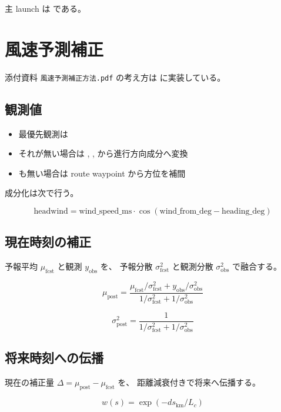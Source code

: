 \documentclass[a4paper,11pt]{article}
\begin{document}
主 launch は  である。

\section{風速予測補正}

添付資料 \texttt{風速予測補正方法.pdf} の考え方は
 に実装している。

\subsection{観測値}

\begin{itemize}
  \item 最優先観測は 
  \item それが無い場合は , ,  から進行方向成分へ変換
  \item {} も無い場合は route waypoint から方位を補間
\end{itemize}

成分化は次で行う。

\[
\mathrm{headwind} = \mathrm{wind\_speed\_ms} \cdot \cos(\mathrm{wind\_from\_deg} - \mathrm{heading\_deg})
\]

\subsection{現在時刻の補正}

予報平均 $\mu_{\mathrm{fcst}}$ と観測 $y_{\mathrm{obs}}$ を、
予報分散 $\sigma_{\mathrm{fcst}}^2$ と観測分散 $\sigma_{\mathrm{obs}}^2$ で融合する。

\[
\mu_{\mathrm{post}} =
\frac{\mu_{\mathrm{fcst}} / \sigma_{\mathrm{fcst}}^2 + y_{\mathrm{obs}} / \sigma_{\mathrm{obs}}^2}
{1 / \sigma_{\mathrm{fcst}}^2 + 1 / \sigma_{\mathrm{obs}}^2}
\]

\[
\sigma_{\mathrm{post}}^2 =
\frac{1}{1 / \sigma_{\mathrm{fcst}}^2 + 1 / \sigma_{\mathrm{obs}}^2}
\]

\subsection{将来時刻への伝播}

現在の補正量 $\Delta = \mu_{\mathrm{post}} - \mu_{\mathrm{fcst}}$ を、
距離減衰付きで将来へ伝播する。

\[
w(s) = \exp(-ds_{\mathrm{km}} / L_c)
\]
\end{document}
